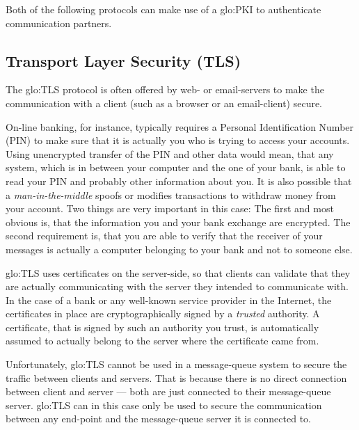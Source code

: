 \bigskip

Both  of  the following  protocols  can make  use  of  a \gls{glo:PKI}  to
authenticate communication partners.

\subsection[Transport Layer Security]{Transport Layer Security (TLS)}

The \gls{glo:TLS}  protocol is often  offered by web- or  email-servers to
make  the  communication   with  a  client  (such  as   a  browser  or  an
email-client) secure.

On-line   banking,   for   instance,   typically   requires   a   Personal
Identification Number  (PIN) to make sure  that it is actually  you who is
trying to access your accounts.  Using unencrypted transfer of the PIN and
other data would mean, that any  system, which is in between your computer
and the  one of your  bank, is  able to read  your PIN and  probably other
information about you. It is also possible that a \emph{man-in-the-middle}
spoofs or modifies  transactions to withdraw money from  your account. Two
things are  very important in  this case: The  first and most  obvious is,
that the information you and  your bank exchange are encrypted. The second
requirement is,  that you  are able  to verify that  the receiver  of your
messages is actually a computer belonging  to your bank and not to someone
else.

\gls{glo:TLS} uses  certificates on the  server-side, so that  clients can
validate  that  they  are  actually  communicating with  the  server  they
intended to  communicate with.  In  the case of  a bank or  any well-known
service  provider   in  the  Internet,  the  certificates   in  place  are
cryptographically  signed by a  \emph{trusted} authority.   A certificate,
that is signed by such an authority you trust, is automatically assumed to
actually belong to the server where the certificate came from.

\bigskip

Unfortunately, \gls{glo:TLS}  cannot be used in a  message-queue system to
secure the traffic  between clients and servers. That  is because there is
no direct connection between client and server --- both are just connected
to their message-queue server. \gls{glo:TLS} can in this case only be used
to secure  the communication between  any end-point and  the message-queue
server it  is connected to.

